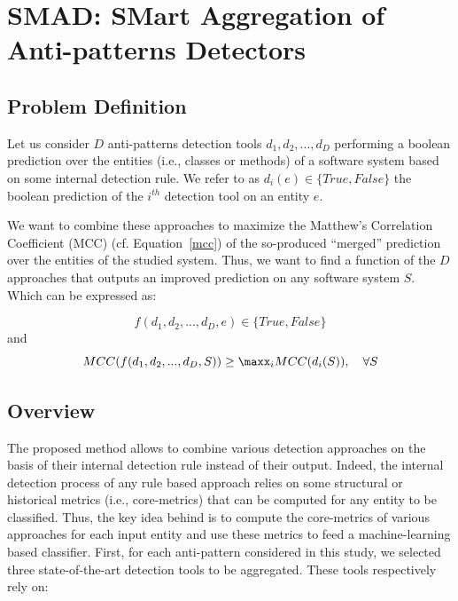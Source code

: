 \section{SMAD: SMart Aggregation of Anti-patterns Detectors}
\label{section: smad}
\subsection{Problem Definition}
Let us consider $D$ anti-patterns detection tools $d_{1},d_{2}, ..., d_{D}$ performing a boolean prediction over the entities (i.e., classes or methods) of a software system based on some internal detection rule. We refer to as $d_{i}(e) \in \{True, False\}$ the boolean prediction of the $i^{th}$ detection tool on an entity $e$.

We want to combine these approaches to maximize the Matthew's Correlation Coefficient (MCC) (cf. Equation~\ref{mcc}) of the so-produced ``merged'' prediction over the entities of the studied system. Thus, we want to find a function of the $D$ approaches that outputs an improved prediction on any software system $S$. Which can be expressed as:

\[f(d_{1},d_{2}, ..., d_{D}, e) \in \{True, False\}\] 
and 
\[MCC(f(d_{1},d_{2}, ..., d_{D}, S)) \geq \maxx_{i} MCC(d_{i}(S)), \quad \forall S\]

\subsection{Overview}
\label{subsection: overview}
The proposed method \NAME{} allows to combine various detection approaches on the basis of their internal detection rule instead of their output. Indeed, the internal detection process of any rule based approach relies on some structural or historical metrics (i.e., core-metrics) that can be computed for any entity to be classified. Thus, the key idea behind \NAME{} is to compute the core-metrics of various approaches for each input entity and use these metrics to feed a machine-learning based classifier. First, for each anti-pattern considered in this study, we selected three state-of-the-art detection tools to be aggregated. These tools respectively rely on:

